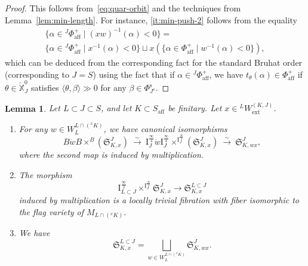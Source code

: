 \documentclass[11pt]{amsart}
\numberwithin{equation}{section}
\theoremstyle{plain}
\newtheorem{lem}[thm]{Lemma}
\theoremstyle{definition}
\newcommand{\I}{{\mathrm I}}
\newcommand{\X}{{\mathbb X}}
\newcommand{\Xd}{\check{\X}}
\newcommand{\xs}{{\ \xrightarrow{\sim}\ }}
\newcommand{\semi}{{{\frac{\infty}{2}}}}
\newcommand{\quar}{{{\frac{\infty}{4}}}}
\newcommand{\Phis}{\Phi^{\mathrm{s}}}
\newcommand{\ex}{\mathrm{ext}}
\newcommand{\af}{\mathrm{aff}}
\newcommand{\comp}{\mathrm{c}}
\newcommand{\rS}{\mathfrak{S}}
\begin{document}
\begin{proof}
This follows from~\eqref{eq:quar-orbit} 
and the techniques from Lemma~\ref{lem:min-length}. For instance, \eqref{it:min-push-2} follows from the equality
\begin{multline*}
\{ \alpha \in {}^J \Phi_\af^+ \mid (xw)^{-1}(\alpha)<0\} = \\
\{ \alpha \in {}^J \Phi_\af^+ \mid x^{-1}(\alpha)<0\} \sqcup x(\{\alpha \in \Phi_\af^+ \mid w^{-1}(\alpha)<0\}),
\end{multline*}
which can be deduced from the corresponding fact for the standard Bruhat order (corresponding to $J=S$) using the fact that if $\alpha \in {}^J \Phi_\af^+$, we have $t_\theta(\alpha) \in \Phi_\af^+$ if $\theta \in \Xd^0_J$ satisfies $\langle \theta, \beta \rangle \gg 0$ for any $\beta \in \Phis_{J^\comp}$.
\end{proof}

\begin{lem}
\label{lem:bi-min-av}
Let $L \subset J \subset S$, and let $K \subset S_\af$ be finitary.
Let $x\in {}^L W_\ex^{(K,J)}$. 
\begin{enumerate}
\item 
\label{it:bi-min-av-1}
For any $w\in W_L^{L\cap ({}^xK)}$, we have canonical isomorphisms 
\[
B\dot{w}B\times^{B} (\rS_{K,x}^{J}) \xs \I_J^{\quar}\dot{w}\I_J^{\quar}\times^{\I_J^{\quar}} (\rS_{K,x}^{J})
 \xs \rS_{K,wx}^J,
\]
where the second map is induced by multiplication. 
\item 
\label{it:bi-min-av-2}
The morphism
\[
\I^\semi_{L \subset J} \times^{\I^\quar_J} \rS_{K,x}^J  \rightarrow \rS_{K,x}^{L \subset J}
\]
induced by multiplication
is a locally trivial fibration with fiber isomorphic to the flag variety of $M_{L \cap ({}^xK)}$. 
\item 
\label{it:bi-min-av-3}
We have 
\[
\rS_{K,x}^{L \subset J}
=\bigsqcup_{w\in W_L^{L\cap ({}^xK)}} \rS^J_{K,wx}. 
\]
\end{enumerate}
\end{lem}
\end{document}
